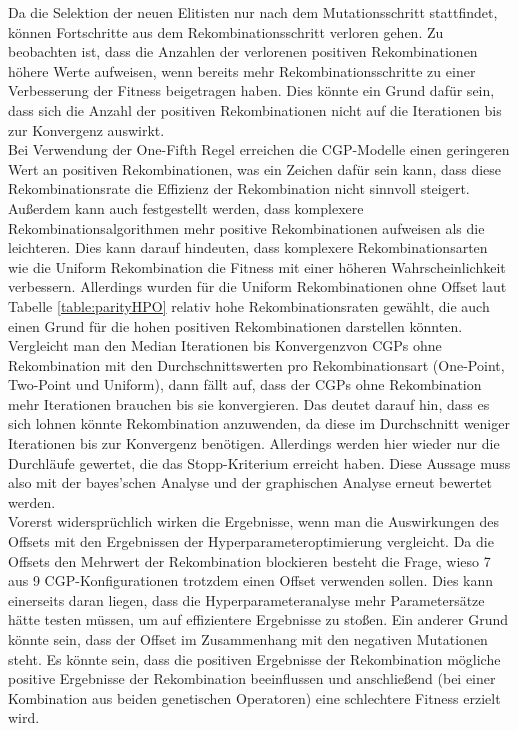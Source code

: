 Da die Selektion der neuen Elitisten nur nach dem Mutationsschritt stattfindet, können Fortschritte aus dem Rekombinationsschritt verloren gehen.
Zu beobachten ist, dass die Anzahlen der verlorenen positiven Rekombinationen höhere Werte aufweisen, wenn bereits mehr Rekombinationsschritte zu einer Verbesserung der Fitness beigetragen haben.
Dies könnte ein Grund dafür sein, dass sich die Anzahl der positiven Rekombinationen nicht auf die Iterationen bis zur Konvergenz auswirkt.\\
Bei Verwendung der One-Fifth Regel erreichen die CGP-Modelle einen geringeren Wert an positiven Rekombinationen, was ein Zeichen dafür sein kann, dass diese Rekombinationsrate die Effizienz der Rekombination nicht sinnvoll steigert.
Außerdem kann auch festgestellt werden, dass komplexere Rekombinationsalgorithmen mehr positive Rekombinationen aufweisen als die leichteren.
Dies kann darauf hindeuten, dass komplexere Rekombinationsarten wie die Uniform Rekombination die Fitness mit einer höheren Wahrscheinlichkeit verbessern.
Allerdings wurden für die Uniform Rekombinationen ohne Offset laut Tabelle \ref{table:parityHPO} relativ hohe Rekombinationsraten gewählt, die auch einen Grund für die hohen positiven Rekombinationen darstellen könnten.\\
Vergleicht man den \glqq Median Iterationen bis Konvergenz\grqq\space von CGPs ohne Rekombination mit den Durchschnittswerten pro Rekombinationsart (One-Point, Two-Point und Uniform), dann fällt auf, dass der CGPs ohne Rekombination mehr Iterationen brauchen bis sie konvergieren.
Das deutet darauf hin, dass es sich lohnen könnte Rekombination anzuwenden, da diese im Durchschnitt weniger Iterationen bis zur Konvergenz benötigen.
Allerdings werden hier wieder nur die Durchläufe gewertet, die das Stopp-Kriterium erreicht haben.
Diese Aussage muss also mit der bayes'schen Analyse und der graphischen Analyse erneut bewertet werden.\\
Vorerst widersprüchlich wirken die Ergebnisse, wenn man die Auswirkungen des Offsets mit den Ergebnissen der Hyperparameteroptimierung vergleicht.
Da die Offsets den Mehrwert der Rekombination blockieren besteht die Frage, wieso 7 aus 9 CGP-Kon\-fi\-gu\-ra\-tionen trotzdem einen Offset verwenden sollen.
Dies kann einerseits daran liegen, dass die Hyperparameteranalyse mehr Parametersätze hätte testen müssen, um auf effizientere Ergebnisse zu stoßen.
Ein anderer Grund könnte sein, dass der Offset im Zusammenhang mit den negativen Mutationen steht.
Es könnte sein, dass die positiven Ergebnisse der Rekombination mögliche positive Ergebnisse der Rekombination beeinflussen und anschließend (bei einer Kombination aus beiden genetischen Operatoren) eine schlechtere Fitness erzielt wird.

